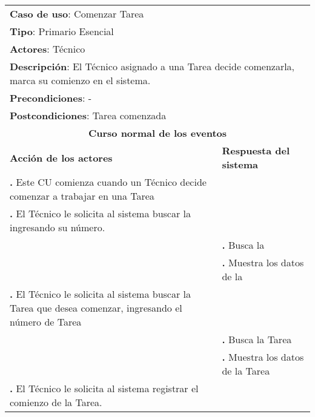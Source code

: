 \documentclass[12pt]{extarticle}
\begin{document}
    \newcommand\inc{\stepcounter{step}\textbf{\thestep. }}
    \newcommand\resetinc{\setcounter{step}{0}}
    \newcommand\raya{\noindent\rule{169mm}{0.8mm}\\}


	\begin{longtable}{ |p{8cm}|p{8cm}| }
		\hline
		\multicolumn{2}{|p{16cm}|}{\textbf{Caso de uso}: Comenzar Tarea}\\
		\multicolumn{2}{|p{16cm}|}{\textbf{Tipo}: Primario Esencial}\\
		\multicolumn{2}{|p{16cm}|}{\textbf{Actores}: Técnico}\\
		\multicolumn{2}{|p{16cm}|}{\textbf{Descripción}: El Técnico asignado a una Tarea decide comenzarla, marca su comienzo en el sistema.}\\
		\multicolumn{2}{|p{16cm}|}{\textbf{Precondiciones}: -}\\
		\multicolumn{2}{|p{16cm}|}{\textbf{Postcondiciones}: Tarea comenzada}\\
		\hline
		\multicolumn{2}{|c|}{\textbf{Curso normal de los eventos}}\\
		\hline
		\textbf{Acción de los actores} & \textbf{Respuesta del sistema}\\
		\hline

			\inc Este CU comienza cuando un Técnico decide comenzar a trabajar en una Tarea& \\
			\hline
            \inc El Técnico le solicita al sistema buscar la \OT{} ingresando su número.& \\
			\hline
            & \inc Busca la \OT{}\\
			\hline
			& \inc Muestra los datos de la \OT{}\\
			\hlineo


			\inc El Técnico le solicita al sistema buscar la Tarea que desea comenzar, ingresando el número de Tarea& \\
			\hline
			& \inc Busca la Tarea\\
			\hline
			& \inc Muestra los datos de la Tarea\\
			\hline
            \inc El Técnico le solicita al sistema registrar el comienzo de la Tarea.&\\
			\hline



\end{longtable}
\end{document}
